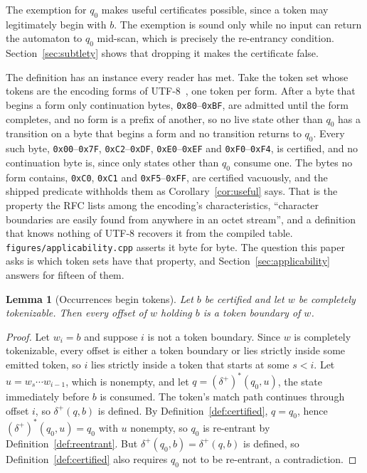 \documentclass[11pt,a4paper]{article}
\theoremstyle{definition}
\theoremstyle{plain}
\newtheorem{lemma}{Lemma}
\newcommand{\code}[1]{\texttt{#1}}
\begin{document}
The exemption for $q_0$ makes useful certificates possible, since a token may legitimately begin with $b$. The exemption
is sound only while no input can return the automaton to $q_0$ mid-scan, which is precisely the re-entrancy condition.
Section~\ref{sec:subtlety} shows that dropping it makes the certificate false.

The definition has an instance every reader has met. Take the token set whose tokens are the encoding forms of
UTF-8~\cite{yergeau2003utf8}, one token per form. After a byte that begins a form only continuation bytes,
\code{0x80}--\code{0xBF}, are admitted until the form completes, and no form is a prefix of another, so no live state
other than $q_0$ has a transition on a byte that begins a form and no transition returns to $q_0$. Every such byte,
\code{0x00}--\code{0x7F}, \code{0xC2}--\code{0xDF}, \code{0xE0}--\code{0xEF} and \code{0xF0}--\code{0xF4}, is certified,
and no continuation byte is, since only states other than $q_0$ consume one. The bytes no form contains, \code{0xC0},
\code{0xC1} and \code{0xF5}--\code{0xFF}, are certified vacuously, and the shipped predicate withholds them as
Corollary~\ref{cor:useful} says. That is the property the RFC lists among the encoding's characteristics, ``character
boundaries are easily found from anywhere in an octet stream'', and a definition that knows nothing of UTF-8 recovers it
from the compiled table. \code{figures/applicability.cpp} asserts it byte for byte. The question this paper asks is
which token sets have that property, and Section~\ref{sec:applicability} answers for fifteen of them.

\begin{lemma}[Occurrences begin tokens]
\label{lem:boundary}
Let $b$ be certified and let $w$ be completely tokenizable. Then every offset of $w$ holding $b$ is a token boundary of
$w$.
\end{lemma}

\begin{proof}
Let $w_i = b$ and suppose $i$ is not a token boundary. Since $w$ is completely tokenizable, every offset is either a
token boundary or lies strictly inside some emitted token, so $i$ lies strictly inside a token that starts at some
$s < i$. Let $u = w_s \cdots w_{i-1}$, which is nonempty, and let $q = (\delta^+)^*(q_0, u)$, the state immediately
before $b$ is consumed. The token's match path continues through offset $i$, so $\delta^+(q, b)$ is defined. By
Definition~\ref{def:certified}, $q = q_0$, hence $(\delta^+)^*(q_0, u) = q_0$ with $u$ nonempty, so $q_0$ is re-entrant
by Definition~\ref{def:reentrant}. But $\delta^+(q_0, b) = \delta^+(q, b)$ is defined, so Definition~\ref{def:certified}
also requires $q_0$ not to be re-entrant, a contradiction.
\end{proof}
\end{document}
